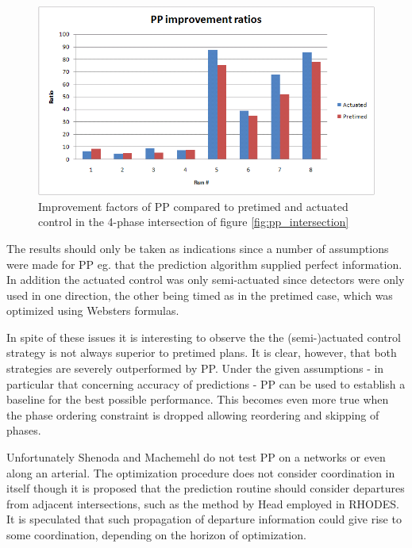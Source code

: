 \begin{figure}[!ht]
\begin{center}
\includegraphics[scale=0.5]{phase-by-phase_improvement_ratios.png} 
\end{center}
\caption{Improvement factors of PP compared to pretimed and actuated control in the 4-phase intersection of figure \ref{fig:pp_intersection}}
\label{fig:pp_improvements}
\end{figure}

The results should only be taken as indications since a number of assumptions were made for PP eg. that the prediction algorithm supplied perfect information. In addition the actuated control was only semi-actuated since detectors were only used in one direction, the other being timed as in the pretimed case, which was optimized using Websters formulas.

In spite of these issues it is interesting to observe the the (semi-)actuated control strategy is not always superior to pretimed plans. It is clear, however, that both strategies are severely outperformed by PP. Under the given assumptions - in particular that concerning accuracy of predictions - PP can be used to establish a baseline for the best possible performance. This becomes even more true when the phase ordering constraint is dropped allowing reordering and skipping of phases.

Unfortunately Shenoda and Machemehl do not test PP on a networks or even along an arterial. The optimization procedure does not consider coordination in itself though it is proposed that the prediction routine should consider departures from adjacent intersections, such as the method by Head employed in RHODES. It is speculated that such propagation of departure information could give rise to some coordination, depending on the horizon of optimization.
